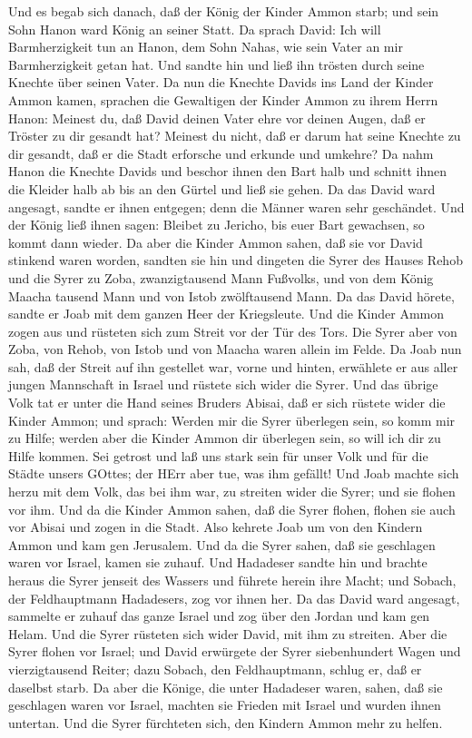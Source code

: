  Und es begab sich danach, daß der König der Kinder Ammon
starb; und sein Sohn Hanon ward König an seiner Statt.  Da
sprach David: Ich will Barmherzigkeit tun an Hanon, dem Sohn Nahas, wie
sein Vater an mir Barmherzigkeit getan hat. Und sandte hin und ließ ihn
trösten durch seine Knechte über seinen Vater. Da nun die Knechte Davids
ins Land der Kinder Ammon kamen,  sprachen die Gewaltigen
der Kinder Ammon zu ihrem Herrn Hanon: Meinest du, daß David deinen
Vater ehre vor deinen Augen, daß er Tröster zu dir gesandt hat? Meinest
du nicht, daß er darum hat seine Knechte zu dir gesandt, daß er die
Stadt erforsche und erkunde und umkehre?  Da nahm Hanon die
Knechte Davids und beschor ihnen den Bart halb und schnitt ihnen die
Kleider halb ab bis an den Gürtel und ließ sie gehen.  Da
das David ward angesagt, sandte er ihnen entgegen; denn die Männer waren
sehr geschändet. Und der König ließ ihnen sagen: Bleibet zu Jericho, bis
euer Bart gewachsen, so kommt dann wieder.  Da aber die
Kinder Ammon sahen, daß sie vor David stinkend waren worden, sandten sie
hin und dingeten die Syrer des Hauses Rehob und die Syrer zu Zoba,
zwanzigtausend Mann Fußvolks, und von dem König Maacha tausend Mann und
von Istob zwölftausend Mann.  Da das David hörete, sandte er
Joab mit dem ganzen Heer der Kriegsleute.  Und die Kinder
Ammon zogen aus und rüsteten sich zum Streit vor der Tür des Tors. Die
Syrer aber von Zoba, von Rehob, von Istob und von Maacha waren allein im
Felde.  Da Joab nun sah, daß der Streit auf ihn gestellet
war, vorne und hinten, erwählete er aus aller jungen Mannschaft in
Israel und rüstete sich wider die Syrer.  Und das übrige
Volk tat er unter die Hand seines Bruders Abisai, daß er sich rüstete
wider die Kinder Ammon;  und sprach: Werden mir die Syrer
überlegen sein, so komm mir zu Hilfe; werden aber die Kinder Ammon dir
überlegen sein, so will ich dir zu Hilfe kommen.  Sei
getrost und laß uns stark sein für unser Volk und für die Städte unsers
GOttes; der HErr aber tue, was ihm gefällt!  Und Joab
machte sich herzu mit dem Volk, das bei ihm war, zu streiten wider die
Syrer; und sie flohen vor ihm.  Und da die Kinder Ammon
sahen, daß die Syrer flohen, flohen sie auch vor Abisai und zogen in die
Stadt. Also kehrete Joab um von den Kindern Ammon und kam gen Jerusalem.
 Und da die Syrer sahen, daß sie geschlagen waren vor
Israel, kamen sie zuhauf.  Und Hadadeser sandte hin und
brachte heraus die Syrer jenseit des Wassers und führete herein ihre
Macht; und Sobach, der Feldhauptmann Hadadesers, zog vor ihnen her.
 Da das David ward angesagt, sammelte er zuhauf das ganze
Israel und zog über den Jordan und kam gen Helam. Und die Syrer rüsteten
sich wider David, mit ihm zu streiten.  Aber die Syrer
flohen vor Israel; und David erwürgete der Syrer siebenhundert Wagen und
vierzigtausend Reiter; dazu Sobach, den Feldhauptmann, schlug er, daß er
daselbst starb.  Da aber die Könige, die unter Hadadeser
waren, sahen, daß sie geschlagen waren vor Israel, machten sie Frieden
mit Israel und wurden ihnen untertan. Und die Syrer fürchteten sich, den
Kindern Ammon mehr zu helfen.

